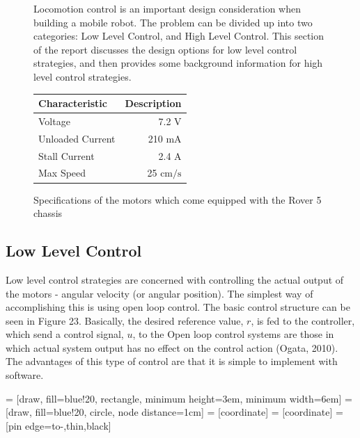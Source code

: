 \documentclass[a4paper]{article}
\begin{document}
\begin{figure}[h]
\begin{minipage}{0.45\textwidth}
Locomotion control is an important design consideration when building a mobile robot. The problem can be divided up into two categories: Low Level Control, and High Level Control. This section of the report discusses the design options for low level control strategies, and then provides some background information for high level control strategies.
\vspace{0.4cm}
\end{minipage}
\hspace{1cm}
\begin{minipage}{0.45\textwidth}
\centering
\caption{Specifications of the motors which come equipped with the Rover 5 chassis}
\footnotesize\begin{tabular}{lr}
\toprule
\textbf{Characteristic} & \textbf{Description}\\
\midrule
Voltage & 7.2 $\si{\volt}$\\
Unloaded Current & 210 $\si{\milli\ampere}$\\
Stall Current & 2.4 $\si{\ampere}$\\
Max Speed & 25 $\si{\centi\meter\per\second}$\\
\bottomrule
\end{tabular}
\end{minipage}
\end{figure}

\subsection{Low Level Control}
Low level control strategies are concerned with controlling the actual output of the motors - angular velocity (or angular position). The simplest way of accomplishing this is using open loop control. The basic control structure can be seen in Figure 23. Basically, the desired reference value, $r$, is fed to the controller, which send a control signal, $u$, to the   Open loop control systems are those in which actual system output has no effect on the control action (Ogata, 2010). The advantages of this type of control are that it is simple to implement with software.  

 = [draw, fill=blue!20, rectangle, 
    minimum height=3em, minimum width=6em]
 = [draw, fill=blue!20, circle, node distance=1cm]
 = [coordinate]
 = [coordinate]
 = [pin edge={to-,thin,black}]
\end{document}
